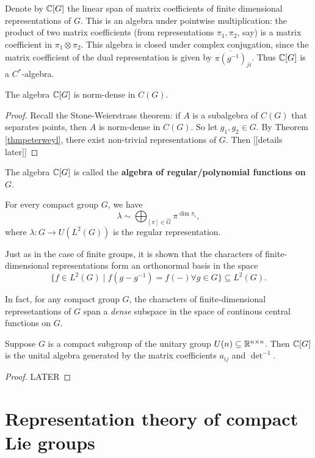 \documentclass[11pt, english]{article}
\begin{document}
Denote by $\mathbb{C}[G]$ the linear span of matrix coefficients of finite dimensional representations of $G$. This is an algebra under pointwise multiplication: the product of two matrix coefficients (from representations $\pi_1,\pi_2$, say) is a matrix coefficient in $\pi_1 \otimes \pi_2$. This algebra is closed under complex conjugation, since the matrix coefficient of the dual representation is given by $\overline{\pi(g^{-1})}_{ji}$. Thus $\mathbb{C}[G]$ is a $C^\ast$-algebra.

\begin{corr}
  The algebra $\mathbb{C}[G]$ is norm-dense in $C(G)$.
\end{corr}
\begin{proof}
Recall the Stone-Weierstrass theorem: if $A$ is a subalgebra of $C(G)$ that separates points, then $A$ is norm-dense in $C(G)$. So let $g_1,g_2 \in G$. By Theorem \ref{thmpeterweyl}, there exist non-trivial representations of $G$. Then [[details later]]
\end{proof}

The algebra $\mathbb{C}[G]$ is called the \textbf{algebra of regular/polynomial functions on $G$}.

\begin{thm}
  For every compact group $G$, we have 
$$
\lambda \sim \bigoplus_{[\pi] \in \widehat G} \pi^{\dim \pi_i},
$$
where $\lambda:G \to U(L^2(G))$ is the regular representation.
\end{thm}

Just as in the case of finite groups, it is shown that the characters of finite-dimensional representations form an orthonormal basis in the space 
$$
\{ f \in L^2(G) \mid f(g - g^{-1}) = f(-) \forall g \in G \} \subseteq L^2(G).
$$

In fact, for any compact group $G$, the characters of finite-dimensional represetantions of $G$ span a \emph{dense} subspace in the space of continous central functions on $G$. 

\begin{thm}
  Suppose $G$ is a compact subgroup of the unitary group $U(n) \subseteq \mathbb{R}^{n\times n}$. Then $\mathbb{C}[G]$ is the unital algebra generated by the matrix coefficients $a_{ij}$ and $\det^{-1}$. 
\end{thm}

\begin{proof}
  LATER
\end{proof}


\section{Representation theory of compact Lie groups}
\end{document}
